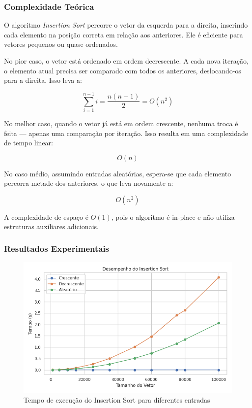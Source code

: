 \subsubsection{Complexidade Teórica}

O algoritmo \textit{Insertion Sort} percorre o vetor da esquerda para a direita, inserindo cada elemento na posição correta em relação aos anteriores. Ele é eficiente para vetores pequenos ou quase ordenados.

No pior caso, o vetor está ordenado em ordem decrescente. A cada nova iteração, o elemento atual precisa ser comparado com todos os anteriores, deslocando-os para a direita. Isso leva a:

\[
\sum_{i=1}^{n-1} i = \frac{n(n-1)}{2} = O(n^2)
\]

No melhor caso, quando o vetor já está em ordem crescente, nenhuma troca é feita — apenas uma comparação por iteração. Isso resulta em uma complexidade de tempo linear:

\[
O(n)
\]

No caso médio, assumindo entradas aleatórias, espera-se que cada elemento percorra metade dos anteriores, o que leva novamente a:

\[
O(n^2)
\]

A complexidade de espaço é \(O(1)\), pois o algoritmo é in-place e não utiliza estruturas auxiliares adicionais.~\cite{geeksforgeeks_insertion_sort}

\subsubsection{Resultados Experimentais}
\begin{figure}[H]
    \centering
    \includegraphics[width=1\textwidth]{../codigos/resultados/insertion_grafico.png}
    \caption{Tempo de execução do Insertion Sort para diferentes entradas}
    \label{fig:insertion-grafico}
\end{figure}

